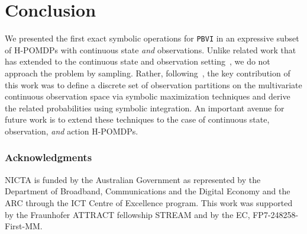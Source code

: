 \documentclass{article} %
\begin{document}
\section{Conclusion} 
%
%
We presented the first exact symbolic operations for \texttt{PBVI} in
an expressive subset of H-POMDPs with continuous state \emph{and} observations.
Unlike related work that has extended to the continuous state and
observation setting~\cite{Perseus_cont}, we do not approach the
problem by sampling.  Rather, following~\cite{pascal_ijcai05}, the key
contribution of this work was to define a discrete set of observation
partitions on the multivariate continuous observation space via
symbolic maximization techniques and derive the related probabilities
using symbolic integration.  An important avenue for future work is to
extend these techniques to the case of
continuous state, observation, \emph{and} action H-POMDPs.

{\small

\subsubsection*{Acknowledgments}

NICTA is funded by the Australian Government as represented by the Department of Broadband, Communications and the Digital Economy and the ARC through the ICT Centre of Excellence program. This work was supported by the Fraunhofer ATTRACT fellowship STREAM and by the EC, FP7-248258-First-MM.
}



\end{document}
